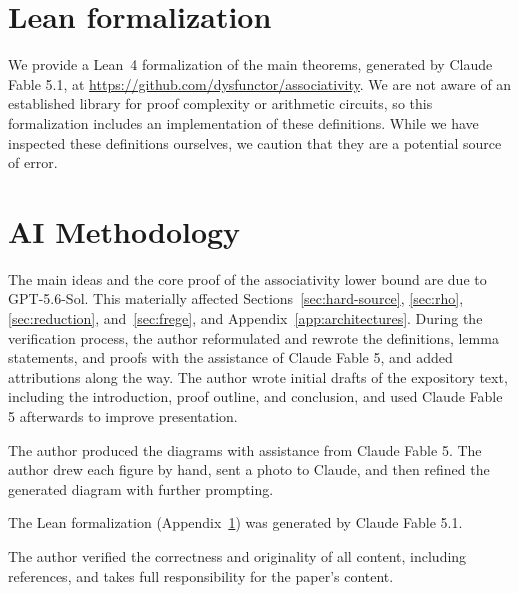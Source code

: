 \documentclass[11pt]{article}
\theoremstyle{definition}
\theoremstyle{remark}
\begin{document}
\section{Lean formalization}
\label{app:lean}

We provide a Lean~4 formalization of the main theorems, generated by Claude Fable 5.1, at \url{https://github.com/dysfunctor/associativity}. We are not aware of an established library for proof complexity or arithmetic circuits, so this formalization includes an implementation of these definitions. While we have inspected these definitions ourselves, we caution that they are a potential source of error.

\section*{AI Methodology}

The main ideas and the core proof of the associativity lower bound are due to GPT-5.6-Sol. This materially affected Sections~\ref{sec:hard-source}, \ref{sec:rho}, \ref{sec:reduction}, and~\ref{sec:frege}, and Appendix~\ref{app:architectures}. During the verification process, the author reformulated and rewrote the definitions, lemma statements, and proofs with the assistance of Claude Fable 5, and added attributions along the way. The author wrote initial drafts of the expository text, including the introduction,
proof outline, and conclusion, and used Claude Fable 5 afterwards to improve presentation.

The author produced the diagrams with assistance from Claude Fable 5. The author drew each figure by hand, sent a photo to Claude, and then refined the generated
diagram with further prompting.

The Lean formalization (Appendix~\ref{app:lean}) was generated by Claude Fable 5.1.

The author verified the correctness and originality of all content, including references, and takes full responsibility for the paper's content.



\end{document}
